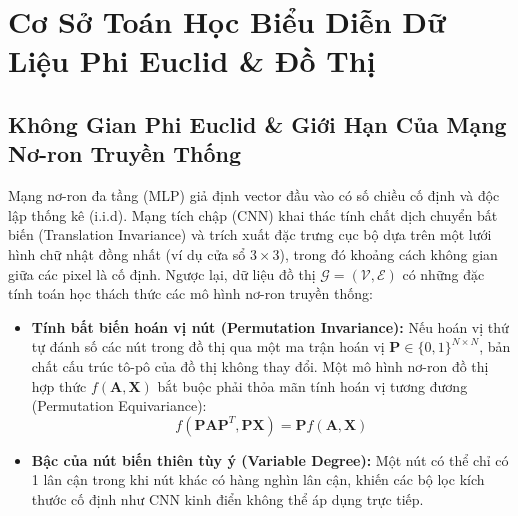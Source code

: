 \documentclass[12pt,a4paper]{report}
\begin{document}
\section{Cơ Sở Toán Học Biểu Diễn Dữ Liệu Phi Euclid \& Đồ Thị}

\subsection{Không Gian Phi Euclid \& Giới Hạn Của Mạng Nơ-ron Truyền Thống}
Mạng nơ-ron đa tầng (MLP) giả định vector đầu vào có số chiều cố định và độc lập thống kê (i.i.d). Mạng tích chập (CNN) khai thác tính chất dịch chuyển bất biến (Translation Invariance) và trích xuất đặc trưng cục bộ dựa trên một lưới hình chữ nhật đồng nhất (ví dụ cửa sổ $3 \times 3$), trong đó khoảng cách không gian giữa các pixel là cố định. Ngược lại, dữ liệu đồ thị $\mathcal{G} = (\mathcal{V}, \mathcal{E})$ có những đặc tính toán học thách thức các mô hình nơ-ron truyền thống:
\begin{itemize}[leftmargin=1.2cm]
    \item \textbf{Tính bất biến hoán vị nút (Permutation Invariance):} Nếu hoán vị thứ tự đánh số các nút trong đồ thị qua một ma trận hoán vị $\mathbf{P} \in \{0, 1\}^{N \times N}$, bản chất cấu trúc tô-pô của đồ thị không thay đổi. Một mô hình nơ-ron đồ thị hợp thức $f(\mathbf{A}, \mathbf{X})$ bắt buộc phải thỏa mãn tính hoán vị tương đương (Permutation Equivariance):
    \begin{equation}
        f(\mathbf{P} \mathbf{A} \mathbf{P}^T, \mathbf{P} \mathbf{X}) = \mathbf{P} f(\mathbf{A}, \mathbf{X})
    \end{equation}
    \item \textbf{Bậc của nút biến thiên tùy ý (Variable Degree):} Một nút có thể chỉ có 1 lân cận trong khi nút khác có hàng nghìn lân cận, khiến các bộ lọc kích thước cố định như CNN kinh điển không thể áp dụng trực tiếp.
\end{itemize}
\end{document}
